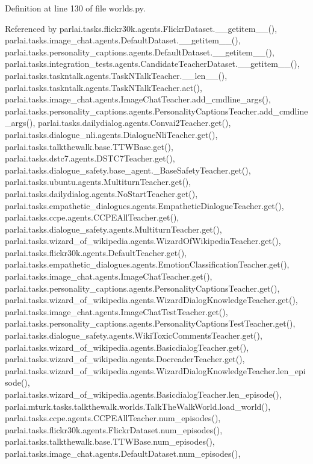 Definition at line 130 of file worlds.\+py.



Referenced by parlai.\+tasks.\+flickr30k.\+agents.\+Flickr\+Dataset.\+\_\+\+\_\+getitem\+\_\+\+\_\+(), parlai.\+tasks.\+image\+\_\+chat.\+agents.\+Default\+Dataset.\+\_\+\+\_\+getitem\+\_\+\+\_\+(), parlai.\+tasks.\+personality\+\_\+captions.\+agents.\+Default\+Dataset.\+\_\+\+\_\+getitem\+\_\+\+\_\+(), parlai.\+tasks.\+integration\+\_\+tests.\+agents.\+Candidate\+Teacher\+Dataset.\+\_\+\+\_\+getitem\+\_\+\+\_\+(), parlai.\+tasks.\+taskntalk.\+agents.\+Task\+N\+Talk\+Teacher.\+\_\+\+\_\+len\+\_\+\+\_\+(), parlai.\+tasks.\+taskntalk.\+agents.\+Task\+N\+Talk\+Teacher.\+act(), parlai.\+tasks.\+image\+\_\+chat.\+agents.\+Image\+Chat\+Teacher.\+add\+\_\+cmdline\+\_\+args(), parlai.\+tasks.\+personality\+\_\+captions.\+agents.\+Personality\+Captions\+Teacher.\+add\+\_\+cmdline\+\_\+args(), parlai.\+tasks.\+dailydialog.\+agents.\+Convai2\+Teacher.\+get(), parlai.\+tasks.\+dialogue\+\_\+nli.\+agents.\+Dialogue\+Nli\+Teacher.\+get(), parlai.\+tasks.\+talkthewalk.\+base.\+T\+T\+W\+Base.\+get(), parlai.\+tasks.\+dstc7.\+agents.\+D\+S\+T\+C7\+Teacher.\+get(), parlai.\+tasks.\+dialogue\+\_\+safety.\+base\+\_\+agent.\+\_\+\+Base\+Safety\+Teacher.\+get(), parlai.\+tasks.\+ubuntu.\+agents.\+Multiturn\+Teacher.\+get(), parlai.\+tasks.\+dailydialog.\+agents.\+No\+Start\+Teacher.\+get(), parlai.\+tasks.\+empathetic\+\_\+dialogues.\+agents.\+Empathetic\+Dialogue\+Teacher.\+get(), parlai.\+tasks.\+ccpe.\+agents.\+C\+C\+P\+E\+All\+Teacher.\+get(), parlai.\+tasks.\+dialogue\+\_\+safety.\+agents.\+Multiturn\+Teacher.\+get(), parlai.\+tasks.\+wizard\+\_\+of\+\_\+wikipedia.\+agents.\+Wizard\+Of\+Wikipedia\+Teacher.\+get(), parlai.\+tasks.\+flickr30k.\+agents.\+Default\+Teacher.\+get(), parlai.\+tasks.\+empathetic\+\_\+dialogues.\+agents.\+Emotion\+Classification\+Teacher.\+get(), parlai.\+tasks.\+image\+\_\+chat.\+agents.\+Image\+Chat\+Teacher.\+get(), parlai.\+tasks.\+personality\+\_\+captions.\+agents.\+Personality\+Captions\+Teacher.\+get(), parlai.\+tasks.\+wizard\+\_\+of\+\_\+wikipedia.\+agents.\+Wizard\+Dialog\+Knowledge\+Teacher.\+get(), parlai.\+tasks.\+image\+\_\+chat.\+agents.\+Image\+Chat\+Test\+Teacher.\+get(), parlai.\+tasks.\+personality\+\_\+captions.\+agents.\+Personality\+Captions\+Test\+Teacher.\+get(), parlai.\+tasks.\+dialogue\+\_\+safety.\+agents.\+Wiki\+Toxic\+Comments\+Teacher.\+get(), parlai.\+tasks.\+wizard\+\_\+of\+\_\+wikipedia.\+agents.\+Basicdialog\+Teacher.\+get(), parlai.\+tasks.\+wizard\+\_\+of\+\_\+wikipedia.\+agents.\+Docreader\+Teacher.\+get(), parlai.\+tasks.\+wizard\+\_\+of\+\_\+wikipedia.\+agents.\+Wizard\+Dialog\+Knowledge\+Teacher.\+len\+\_\+episode(), parlai.\+tasks.\+wizard\+\_\+of\+\_\+wikipedia.\+agents.\+Basicdialog\+Teacher.\+len\+\_\+episode(), parlai.\+mturk.\+tasks.\+talkthewalk.\+worlds.\+Talk\+The\+Walk\+World.\+load\+\_\+world(), parlai.\+tasks.\+ccpe.\+agents.\+C\+C\+P\+E\+All\+Teacher.\+num\+\_\+episodes(), parlai.\+tasks.\+flickr30k.\+agents.\+Flickr\+Dataset.\+num\+\_\+episodes(), parlai.\+tasks.\+talkthewalk.\+base.\+T\+T\+W\+Base.\+num\+\_\+episodes(), parlai.\+tasks.\+image\+\_\+chat.\+agents.\+Default\+Dataset.\+num\+\_\+episodes(), 